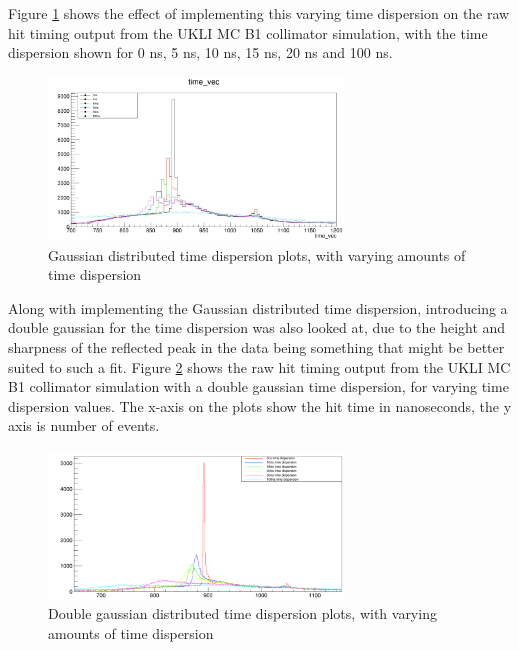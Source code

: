 Figure \ref{fig:gauss_time_dispersion} shows the effect of implementing this varying time dispersion on the raw hit timing output from the UKLI MC B1 collimator simulation, with the time dispersion shown for 0 ns, 5 ns, 10 ns, 15 ns, 20 ns and 100 ns. 

\begin{figure}
    \centering
    \includegraphics[width=0.7\textwidth]{Figures/gauss_time_dispersion.PNG}
    \caption{Gaussian distributed time dispersion plots, with varying amounts of time dispersion}
    \label{fig:gauss_time_dispersion}
\end{figure}

Along with implementing the Gaussian distributed time dispersion, introducing a double gaussian for the time dispersion was also looked at, due to the height and sharpness of the reflected peak in the data being something that might be better suited to such a fit. Figure \ref{fig:double_gauss_time_dispersion} shows the raw hit timing output from the UKLI MC B1 collimator simulation with a double gaussian time dispersion, for varying time dispersion values. The x-axis on the plots show the hit time in nanoseconds, the y axis is number of events. 

\begin{figure}
    \centering
    \includegraphics[width=0.7\textwidth]{Figures/double_gauss_time_dispersion.PNG}
    \caption{Double gaussian distributed time dispersion plots, with varying amounts of time dispersion}
    \label{fig:double_gauss_time_dispersion}
\end{figure}

